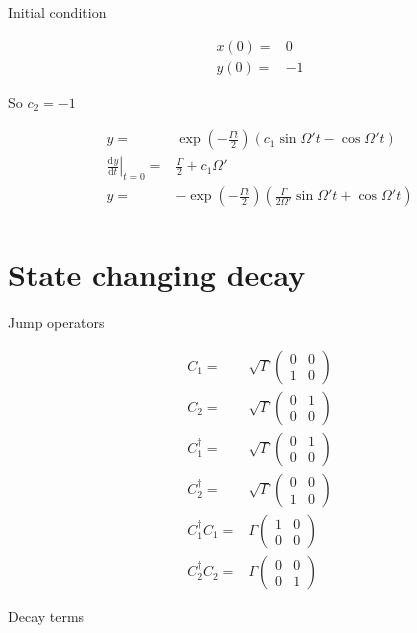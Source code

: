 \documentclass[10pt,fleqn]{article}
\newcommand{\ud}{\mathrm{d}}
\newcommand{\eqar}[1]
{
  \begin{align*}
    #1
  \end{align*}
}
\newcommand{\paren}[1]{{\left({#1}\right)}}
\newcommand{\diff}[3][{}]{{\frac{\ud^{#1} {#2}}{\ud {#3}{}^{#1}}}}
\begin{document}
Initial condition
\eqar{
  x\paren{0}=&0\\
  y\paren{0}=&-1
}
So $c_2=-1$
\eqar{
  y=&\exp\paren{-\frac{\Gamma t}{2}}\paren{c_1\sin\Omega't-\cos\Omega't}\\
  \left.\diff{y}{t}\right|_{t=0}=&\frac{\Gamma}{2}+c_1\Omega'\\
  y=&-\exp\paren{-\frac{\Gamma t}{2}}\paren{\frac{\Gamma}{2\Omega'}\sin\Omega't+\cos\Omega't}\\
}

\section{State changing decay}
Jump operators
\eqar{
  C_1=&\sqrt{\Gamma}\begin{pmatrix}
    0&0\\
    1&0
  \end{pmatrix}\\
  C_2=&\sqrt{\Gamma}\begin{pmatrix}
    0&1\\
    0&0
  \end{pmatrix}\\
  C^\dagger_1=&\sqrt{\Gamma}\begin{pmatrix}
    0&1\\
    0&0
  \end{pmatrix}\\
  C^\dagger_2=&\sqrt{\Gamma}\begin{pmatrix}
    0&0\\
    1&0
  \end{pmatrix}\\
  C^\dagger_1C_1=&\Gamma\begin{pmatrix}
    1&0\\
    0&0
  \end{pmatrix}\\
  C^\dagger_2C_2=&\Gamma\begin{pmatrix}
    0&0\\
    0&1
  \end{pmatrix}
}
Decay terms
\end{document}
